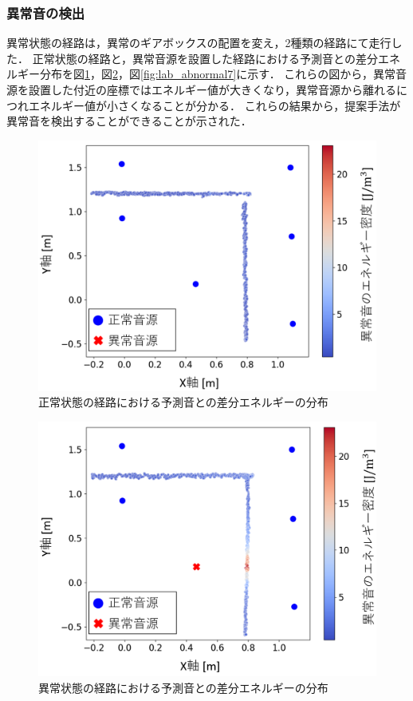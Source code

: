 \documentclass[../main]{subfiles}
\begin{document}
\subsubsection{異常音の検出} \label{subsubsec:anomaly_detection}
異常状態の経路は，異常のギアボックスの配置を変え，2種類の経路にて走行した．
正常状態の経路と，異常音源を設置した経路における予測音との差分エネルギー分布を図\ref{fig:lab_normal}，図\ref{fig:lab_abnormal2}，図\ref{fig:lab_abnormal7}に示す．
これらの図から，異常音源を設置した付近の座標ではエネルギー値が大きくなり，異常音源から離れるにつれエネルギー値が小さくなることが分かる．
これらの結果から，提案手法が異常音を検出することができることが示された．


\begin{figure}[t]
  \centering
  \includegraphics[keepaspectratio, width=0.7\linewidth]{chap4/lab_normal.png}
  \caption{正常状態の経路における予測音との差分エネルギーの分布}
  \label{fig:lab_normal}
\end{figure}

\begin{figure}[t]
  \centering
  \includegraphics[keepaspectratio, width=0.7\linewidth]{chap4/lab_abnormal2.png}
  \caption{異常状態の経路における予測音との差分エネルギーの分布}
  \label{fig:lab_abnormal2}
\end{figure}
\end{document}
